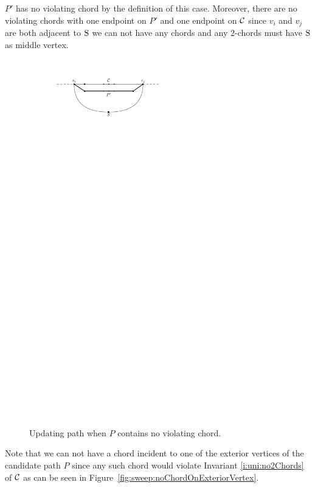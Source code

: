     $P'$ has no violating chord by the definition of this case. Moreover, there are no violating chords with one endpoint on $P'$ and one endpoint on $\mathcal{C}$ since $v_i$ and $v_j$ are both adjacent to $\mathrm{S}$ we can not have any chords and any $2$-chords must have $\mathrm{S}$ as middle vertex.
    \begin{figure}[t]
      \centering
      \includegraphics[scale=1]{unifiedAlgo/img/sweep/cases/noIrregularity}
      \caption{Updating path when $P$ contains no violating chord.}
      \label{fig:sweep:noIrregularity}
    \end{figure}

    Note that we can not have a chord incident to one of the exterior vertices of the candidate path $P$ since any such chord would violate Invariant \ref{i:uni:no2Chords} of $\mathcal{C}$ as can be seen in Figure~\ref{fig:sweep:noChordOnExteriorVertex}.

